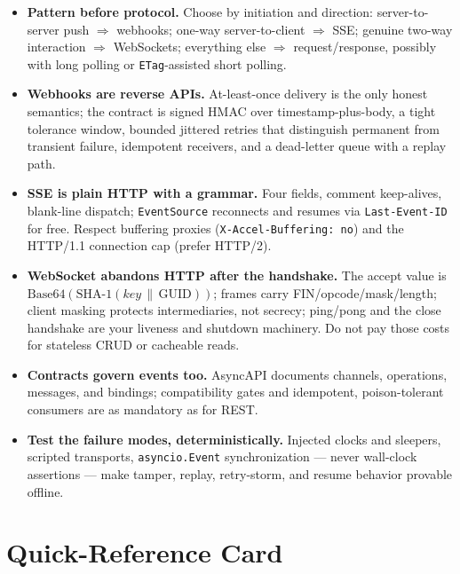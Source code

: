 \begin{itemize}
  \item \textbf{Pattern before protocol.} Choose by initiation and direction:
        server-to-server push $\Rightarrow$ webhooks; one-way server-to-client
        $\Rightarrow$ SSE; genuine two-way interaction $\Rightarrow$
        WebSockets; everything else $\Rightarrow$ request/response, possibly
        with long polling or \texttt{ETag}-assisted short polling.
  \item \textbf{Webhooks are reverse APIs.} At-least-once delivery is the
        only honest semantics; the contract is signed HMAC over
        timestamp-plus-body, a tight tolerance window, bounded jittered
        retries that distinguish permanent from transient failure, idempotent
        receivers, and a dead-letter queue with a replay path.
  \item \textbf{SSE is plain HTTP with a grammar.} Four fields, comment
        keep-alives, blank-line dispatch; \texttt{EventSource} reconnects and
        resumes via \texttt{Last-Event-ID} for free. Respect buffering
        proxies (\texttt{X-Accel-Buffering: no}) and the HTTP/1.1
        connection cap (prefer HTTP/2).
  \item \textbf{WebSocket abandons HTTP after the handshake.} The accept
        value is $\mathrm{Base64}(\mathrm{SHA\text{-}1}(key \,\|\,
        \mathrm{GUID}))$; frames carry FIN/opcode/mask/length; client masking
        protects intermediaries, not secrecy; ping/pong and the close
        handshake are your liveness and shutdown machinery. Do not pay those
        costs for stateless CRUD or cacheable reads.
  \item \textbf{Contracts govern events too.} AsyncAPI documents channels,
        operations, messages, and bindings; compatibility gates and
        idempotent, poison-tolerant consumers are as mandatory as for REST.
  \item \textbf{Test the failure modes, deterministically.} Injected clocks
        and sleepers, scripted transports, \texttt{asyncio.Event}
        synchronization --- never wall-clock assertions --- make tamper,
        replay, retry-storm, and resume behavior provable offline.
\end{itemize}

\section{Quick-Reference Card}
\label{sec:ch11-quickref}

